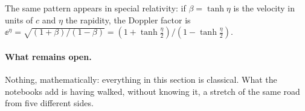 The same pattern appears in special relativity: if $\beta=\tanh\eta$ is the
velocity in units of $c$ and $\eta$ the rapidity, the Doppler factor is
$\ee^{\eta}=\sqrt{(1+\beta)/(1-\beta)}=(1+\tanh\frac\eta2)/(1-\tanh\frac\eta2)$.

\paragraph{What remains open.}
Nothing, mathematically: everything in this section is classical. What the
notebooks add is having walked, without knowing it, a stretch of the same road
from five different sides.
